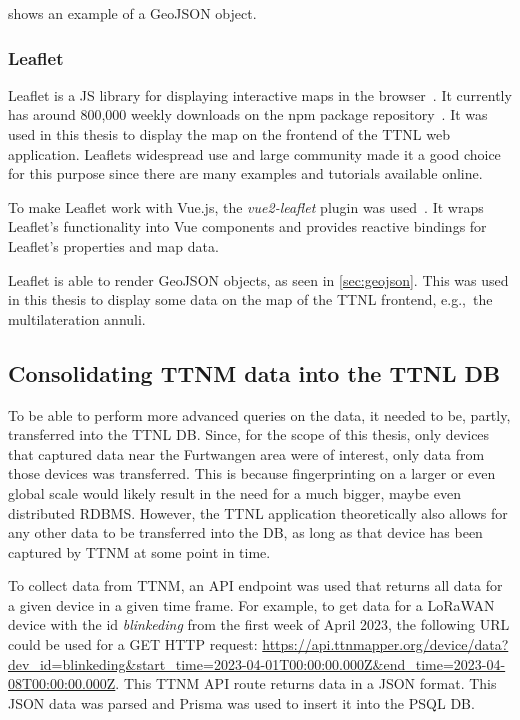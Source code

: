  shows an example of a GeoJSON object.

\subsubsection{Leaflet}\label{sec:leaflet}

Leaflet is a \ac{JS} library for displaying interactive maps in the browser~\cite{volodymyr_agafonkin_leaflet_2023}.
It currently has around 800,000 weekly downloads on the npm package repository~\cite{npm_leaflet_2023}.
It was used in this thesis to display the map on the frontend of the \ac{TTNL} web application.
Leaflets widespread use and large community made it a good choice for this purpose since there are many examples and tutorials available online.

To make Leaflet work with Vue.js, the \emph{vue2-leaflet} plugin was used~\cite{vue_leaflet_team_vue_nodate}.
It wraps Leaflet's functionality into Vue components and provides reactive bindings for Leaflet's properties and map data.

Leaflet is able to render GeoJSON objects, as seen in \cref{sec:geojson}.
This was used in this thesis to display some data on the map of the \ac{TTNL} frontend, e.g.,\ the multilateration annuli.

\subsection{Consolidating \acl{TTNM} data into the \acl{TTNL} \acl{DB}}\label{sec:consolidating-ttnm-data-into-ttnl-db}

To be able to perform more advanced queries on the data, it needed to be, partly, transferred into the \ac{TTNL} \acl{DB}.
Since, for the scope of this thesis, only devices that captured data near the Furtwangen area were of interest, only data from those devices was transferred.
This is because fingerprinting on a larger or even global scale would likely result in the need for a much bigger, maybe even distributed \ac{RDBMS}.
However, the \ac{TTNL} application theoretically also allows for any other data to be transferred into the \ac{DB}, as long as that device has been captured by \ac{TTNM} at some point in time.

To collect data from \ac{TTNM}, an \ac{API} endpoint was used that returns all data for a given device in a given time frame.
For example, to get data for a \ac{LoRaWAN} device with the id \emph{blinkeding} from the first week of April 2023, the following \ac{URL} could be used for a GET \ac{HTTP} request: \url{https://api.ttnmapper.org/device/data?dev_id=blinkeding&start_time=2023-04-01T00:00:00.000Z&end_time=2023-04-08T00:00:00.000Z}.
This \ac{TTNM} \ac{API} route returns data in a \ac{JSON} format.
This \ac{JSON} data was parsed and Prisma was used to insert it into the \ac{PSQL} \ac{DB}.

